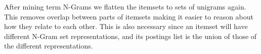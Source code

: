 \documentclass{sig-alternate}
\begin{document}
After mining term N-Grams we flatten the itemsets to sets of unigrams again. This removes overlap between parts of  itemsets making it easier to reason about how they relate to each other. 
This is also necessary since an itemset will have different N-Gram set representations, and its  postings list is the union of those of the different representations.





\end{document}

